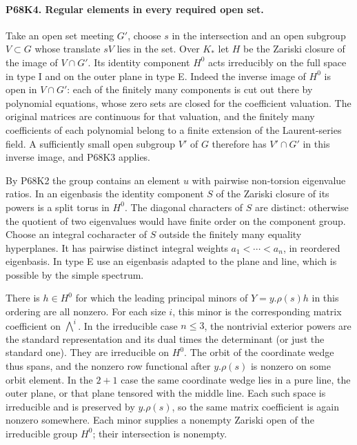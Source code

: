 \paragraph{P68K4. Regular elements in every required open set.}
Take an open set meeting $G'$, choose $s$ in the intersection
and an open subgroup $V\subset G$ whose translate $sV$ lies
in the set. Over $K_*$ let $H$ be the Zariski closure of the
image of $V\cap G'$. Its identity component $H^0$ acts
irreducibly on the full space in type I and on the outer plane
in type E. Indeed the inverse image of $H^0$ is open in
$V\cap G'$: each of the finitely many components is cut out
there by polynomial equations, whose zero sets are closed for
the coefficient valuation. The original matrices are continuous
for that valuation, and the finitely many coefficients of each
polynomial belong to a finite extension of the Laurent-series
field. A sufficiently small open subgroup $V'$ of $G$ therefore
has $V'\cap G'$ in this inverse image, and P68K3 applies.

By P68K2 the group contains an element $u$ with pairwise
non-torsion eigenvalue ratios. In an eigenbasis the identity
component $S$ of the Zariski closure of its powers is a split
torus in $H^0$. The diagonal characters of $S$ are distinct:
otherwise the quotient of two eigenvalues would have finite
order on the component group. Choose an integral cocharacter
of $S$ outside the finitely many equality hyperplanes. It has
pairwise distinct integral weights $a_1<\cdots<a_n$, in reordered
eigenbasis. In type E use an eigenbasis adapted to the plane
and line, which is possible by the simple spectrum.

There is $h\in H^0$ for which the leading principal minors
of $Y=y.\rho(s)h$ in this ordering are all nonzero. For each
size $i$, this minor is the corresponding matrix coefficient on
$\bigwedge^i$. In the irreducible case $n\le3$, the nontrivial
exterior powers are the standard representation and its dual
times the determinant (or just the standard one). They are
irreducible on $H^0$. The orbit of the coordinate wedge thus
spans, and the nonzero row functional after $y.\rho(s)$ is nonzero
on some orbit element. In the $2+1$ case the same coordinate
wedge lies in a pure line, the outer plane, or that plane tensored
with the middle line. Each such space is irreducible and is
preserved by $y.\rho(s)$, so the same matrix coefficient is
again nonzero somewhere. Each minor supplies a nonempty Zariski
open of the irreducible group $H^0$; their intersection is nonempty.

